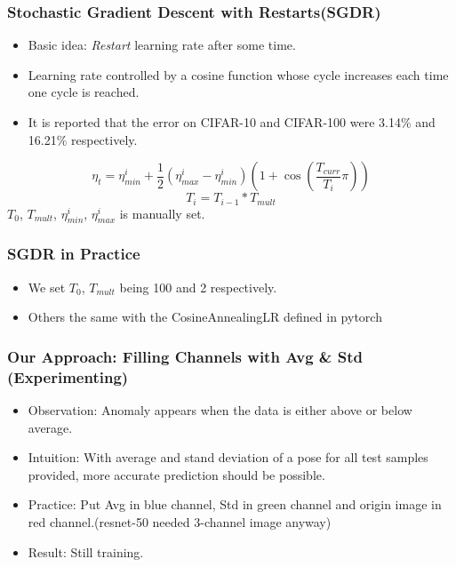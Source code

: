 \documentclass{beamer}
\begin{document}
\begin{frame}
\frametitle{Stochastic Gradient Descent with Restarts(SGDR) \cite{SGDR}}

	\begin{itemize}
		\item Basic idea: \textit{Restart} learning rate after some time.
		\item Learning rate controlled by a cosine function whose cycle increases each time one cycle is reached. 
		\item It is reported that the error on CIFAR-10 and CIFAR-100 were 3.14\% and 16.21\% respectively\cite{SGDR}.
	\end{itemize}
	$$ \eta_t = \eta_{min}^i + \frac{1}{2}(\eta_{max}^i-\eta_{min}^i)(1 + \cos(\frac{T_{curr}}{T_i}\pi))$$
	$$ T_{i} = T_{i-1} * T_{mult} $$
	$T_0$, $T_{mult}$, $\eta_{min}^i$, $\eta_{max}^i$ is manually set.
\end{frame}

\begin{frame}
\frametitle{SGDR in Practice}

	\begin{itemize}
		\item We set $T_0$, $T_{mult}$ being 100 and 2 respectively.
		\item Others the same with the CosineAnnealingLR defined in pytorch
	\end{itemize}

\end{frame}

\begin{frame}
\frametitle{Our Approach: Filling Channels with Avg \& Std (Experimenting)}

	\begin{itemize}
		\item Observation: Anomaly appears when the data is either above or below average.
		\item Intuition: With average and stand deviation of a pose for all test samples provided, more accurate prediction should be possible.
		\item Practice: Put Avg in blue channel, Std in green channel and origin image in red channel.(resnet-50 needed 3-channel image anyway)
		\item Result: Still training.
	\end{itemize}

\end{frame}
\end{document}
